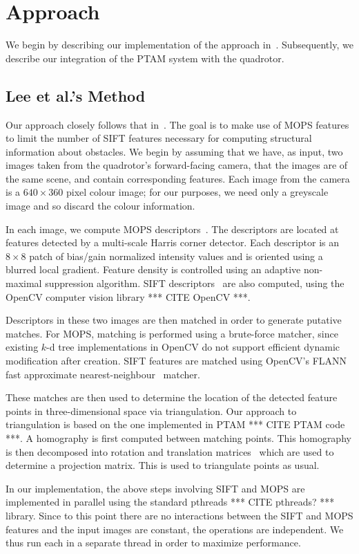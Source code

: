\documentclass{acmsiggraph}
\begin{document}
\section{Approach}
We begin by describing our implementation of the approach in~\cite{lee2011}. Subsequently, we describe our integration of the PTAM system with the quadrotor.

\subsection{Lee et al.'s Method}
Our approach closely follows that in~\cite{lee2011}. The goal is to make use of MOPS features to limit the number of SIFT features necessary for computing structural information about obstacles. We begin by assuming that we have, as input, two images taken from the quadrotor's forward-facing camera, that the images are of the same scene, and contain corresponding features. Each image from the camera is a $640 \times 360$ pixel colour image; for our purposes, we need only a greyscale image and so discard the colour information.

In each image, we compute MOPS descriptors~\cite{BSW05}. The descriptors are located at features detected by a multi-scale Harris corner detector. Each descriptor is an $8 \times 8$ patch of bias/gain normalized intensity values and is oriented using a blurred local gradient. Feature density is controlled using an adaptive non-maximal suppression algorithm. SIFT descriptors~\cite{lowe2004} are also computed, using the OpenCV computer vision library *** CITE OpenCV ***.

Descriptors in these two images are then matched in order to generate putative matches. For MOPS, matching is performed using a brute-force matcher, since existing $k$-d tree implementations in OpenCV do not support efficient dynamic modification after creation. SIFT features are matched using OpenCV's FLANN fast approximate nearest-neighbour~\cite{flann2009} matcher.

These matches are then used to determine the location of the detected feature points in three-dimensional space via triangulation. Our approach to triangulation is based on the one implemented in PTAM *** CITE PTAM code ***. A homography is first computed between matching points. This homography is then decomposed into rotation and translation matrices~\cite{inria2007} which are used to determine a projection matrix. This is used to triangulate points as usual.

In our implementation, the above steps involving SIFT and MOPS are implemented in parallel using the standard pthreads *** CITE pthreads? *** library. Since to this point there are no interactions between the SIFT and MOPS features and the input images are constant, the operations are independent. We thus run each in a separate thread in order to maximize performance.
\end{document}
